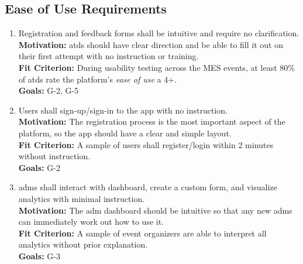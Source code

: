 \documentclass[12pt]{article}
\begin{document}
\subsection{Ease of Use Requirements}
\begin{enumerate}[label=\bfseries ER-\arabic*:, wide=0pt, leftmargin=*, 
  ref=\bfseries ER-\arabic*]
  \item \label{ER1} Registration and feedback forms shall be intuitive and require no clarification.\\[2mm]
    {\bf Motivation:} \Glspl{atd} should have clear direction and be able to fill it out on their first attempt with no instruction or training.\\
    {\bf Fit Criterion:} During usability testing across the MES events, at least 80\% of \glspl{atd} rate the platform's \textit{ease of use} a 4+.\\
    {\bf Goals:} G-2, G-5
  \item \label{ER2} Users shall sign-up/sign-in to the app with no instruction. \\[2mm]
    {\bf Motivation:} The registration process is the most important aspect of the platform, so the app should have a clear and simple layout.\\
    {\bf Fit Criterion:} A sample of users shall register/login within 2 minutes without instruction.\\
    {\bf Goals:} G-2
  \item \label{ER3} \Glspl{adm} shall interact with dashboard, create a custom form, and visualize analytics with minimal instruction.\\[2mm]
    {\bf Motivation:} The \gls{adm} dashboard should be intuitive so that any new \glspl{adm} can immediately work out how to use it.\\
    {\bf Fit Criterion:} A sample of event organizers are able to interpret all analytics without prior explanation.\\
    {\bf Goals:} G-3
\end{enumerate}
\end{document}
